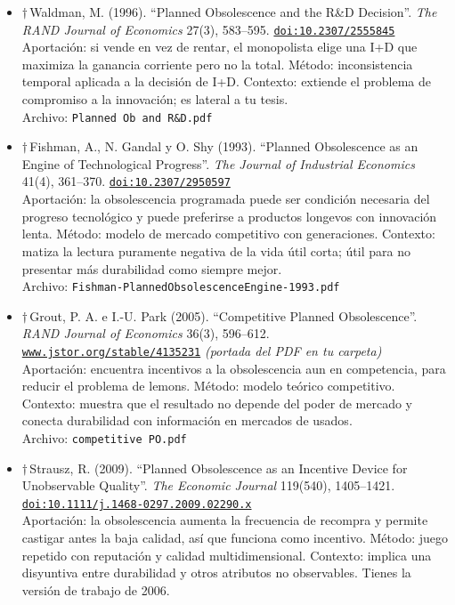 \documentclass[11pt]{article}
\begin{document}
\begin{itemize}
\item $\dagger$\,Waldman, M. (1996). ``Planned Obsolescence and the R\&D Decision''. \textit{The RAND Journal of Economics} 27(3), 583--595. \href{https://doi.org/10.2307/2555845}{\texttt{doi:10.2307/2555845}}\\
Aportación: si vende en vez de rentar, el monopolista elige una I+D que maximiza la ganancia corriente pero no la total. Método: inconsistencia temporal aplicada a la decisión de I+D. Contexto: extiende el problema de compromiso a la innovación; es lateral a tu tesis.\\
{\footnotesize Archivo: \texttt{Planned Ob and R\&D.pdf}}
\item $\dagger$\,Fishman, A., N. Gandal y O. Shy (1993). ``Planned Obsolescence as an Engine of Technological Progress''. \textit{The Journal of Industrial Economics} 41(4), 361--370. \href{https://doi.org/10.2307/2950597}{\texttt{doi:10.2307/2950597}}\\
Aportación: la obsolescencia programada puede ser condición necesaria del progreso tecnológico y puede preferirse a productos longevos con innovación lenta. Método: modelo de mercado competitivo con generaciones. Contexto: matiza la lectura puramente negativa de la vida útil corta; útil para no presentar más durabilidad como siempre mejor.\\
{\footnotesize Archivo: \texttt{Fishman-PlannedObsolescenceEngine-1993.pdf}}
\item $\dagger$\,Grout, P. A. e I.-U. Park (2005). ``Competitive Planned Obsolescence''. \textit{RAND Journal of Economics} 36(3), 596--612. \href{https://www.jstor.org/stable/4135231}{\texttt{www.jstor.org/stable/4135231}} \textit{(portada del PDF en tu carpeta)}\\
Aportación: encuentra incentivos a la obsolescencia aun en competencia, para reducir el problema de lemons. Método: modelo teórico competitivo. Contexto: muestra que el resultado no depende del poder de mercado y conecta durabilidad con información en mercados de usados.\\
{\footnotesize Archivo: \texttt{competitive PO.pdf}}
\item $\dagger$\,Strausz, R. (2009). ``Planned Obsolescence as an Incentive Device for Unobservable Quality''. \textit{The Economic Journal} 119(540), 1405--1421. \href{https://doi.org/10.1111/j.1468-0297.2009.02290.x}{\texttt{doi:10.1111/j.1468-0297.2009.02290.x}}\\
Aportación: la obsolescencia aumenta la frecuencia de recompra y permite castigar antes la baja calidad, así que funciona como incentivo. Método: juego repetido con reputación y calidad multidimensional. Contexto: implica una disyuntiva entre durabilidad y otros atributos no observables. Tienes la versión de trabajo de 2006.\\

\end{itemize}
\end{document}
